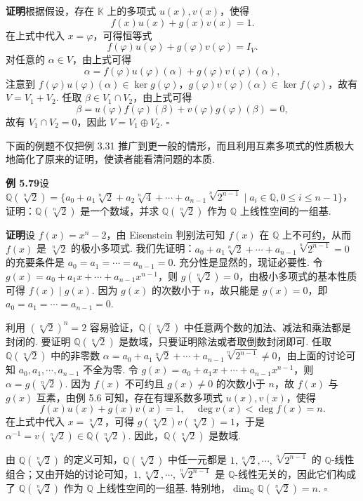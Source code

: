 \documentclass[UTF8, 12pt, fontset=fandol, oneside]{ctexart}
\begin{document}
\noindent\textbf{证明}\quad 根据假设，存在 $\mathbb{K}$ 上的多项式 $u(x),v(x)$，使得
\[
f(x)u(x)+g(x)v(x)=1.
\]
在上式中代入 $x=\varphi$，可得恒等式
\[
f(\varphi)u(\varphi)+g(\varphi)v(\varphi)=I_V.
\]
对任意的 $\alpha\in V$，由上式可得
\[
\alpha=f(\varphi)u(\varphi)(\alpha)+g(\varphi)v(\varphi)(\alpha),
\]
注意到 $f(\varphi)u(\varphi)(\alpha)\in\ker g(\varphi)$，$g(\varphi)v(\varphi)(\alpha)\in\ker f(\varphi)$，故有 $V=V_1+V_2$. 任取 $\beta\in V_1\cap V_2$，由上式可得
\[
\beta=u(\varphi)f(\varphi)(\beta)+v(\varphi)g(\varphi)(\beta)=0,
\]
故有 $V_1\cap V_2=0$，因此 $V=V_1\oplus V_2$. \hfill $\square$

下面的例题不仅把例 3.31 推广到更一般的情形，而且利用互素多项式的性质极大地简化了原来的证明，使读者能看清问题的本质.

\noindent\textbf{例 5.79}\quad 设 $\mathbb{Q}(\sqrt[n]{2})=\{a_0+a_1\sqrt[n]{2}+a_2\sqrt[n]{4}+\cdots+a_{n-1}\sqrt[n]{2^{n-1}}\mid a_i\in\mathbb{Q},0\le i\le n-1\}$，证明：$\mathbb{Q}(\sqrt[n]{2})$ 是一个数域，并求 $\mathbb{Q}(\sqrt[n]{2})$ 作为 $\mathbb{Q}$ 上线性空间的一组基.

\noindent\textbf{证明}\quad 设 $f(x)=x^n-2$，由 Eisenstein 判别法可知 $f(x)$ 在 $\mathbb{Q}$ 上不可约，从而 $f(x)$ 是 $\sqrt[n]{2}$ 的极小多项式. 我们先证明：$a_0+a_1\sqrt[n]{2}+\cdots+a_{n-1}\sqrt[n]{2^{n-1}}=0$ 的充要条件是 $a_0=a_1=\cdots=a_{n-1}=0$. 充分性是显然的，现证必要性. 令 $g(x)=a_0+a_1x+\cdots+a_{n-1}x^{n-1}$，则 $g(\sqrt[n]{2})=0$，由极小多项式的基本性质可得 $f(x)\mid g(x)$. 因为 $g(x)$ 的次数小于 $n$，故只能是 $g(x)=0$，即 $a_0=a_1=\cdots=a_{n-1}=0$.

利用 $(\sqrt[n]{2})^n=2$ 容易验证，$\mathbb{Q}(\sqrt[n]{2})$ 中任意两个数的加法、减法和乘法都是封闭的. 要证明 $\mathbb{Q}(\sqrt[n]{2})$ 是数域，只要证明除法或者取倒数封闭即可. 任取 $\mathbb{Q}(\sqrt[n]{2})$ 中的非零数 $\alpha=a_0+a_1\sqrt[n]{2}+\cdots+a_{n-1}\sqrt[n]{2^{n-1}}\ne0$，由上面的讨论可知 $a_0,a_1,\cdots,a_{n-1}$ 不全为零. 令 $g(x)=a_0+a_1x+\cdots+a_{n-1}x^{n-1}$，则 $\alpha=g(\sqrt[n]{2})$. 因为 $f(x)$ 不可约且 $g(x)\ne0$ 的次数小于 $n$，故 $f(x)$ 与 $g(x)$ 互素，由例 5.6 可知，存在有理系数多项式 $u(x),v(x)$，使得
\[
f(x)u(x)+g(x)v(x)=1,\quad \deg v(x)<\deg f(x)=n.
\]
在上式中代入 $x=\sqrt[n]{2}$，可得 $g(\sqrt[n]{2})v(\sqrt[n]{2})=1$，于是 $\alpha^{-1}=v(\sqrt[n]{2})\in\mathbb{Q}(\sqrt[n]{2})$. 因此，$\mathbb{Q}(\sqrt[n]{2})$ 是数域.

由 $\mathbb{Q}(\sqrt[n]{2})$ 的定义可知，$\mathbb{Q}(\sqrt[n]{2})$ 中任一元都是 $1,\sqrt[n]{2},\cdots,\sqrt[n]{2^{n-1}}$ 的 $\mathbb{Q}$-线性组合；又由开始的讨论可知，$1,\sqrt[n]{2},\cdots,\sqrt[n]{2^{n-1}}$ 是 $\mathbb{Q}$-线性无关的，因此它们构成了 $\mathbb{Q}(\sqrt[n]{2})$ 作为 $\mathbb{Q}$ 上线性空间的一组基. 特别地，$\dim_{\mathbb{Q}}\mathbb{Q}(\sqrt[n]{2})=n$. \hfill $\square$
\end{document}
